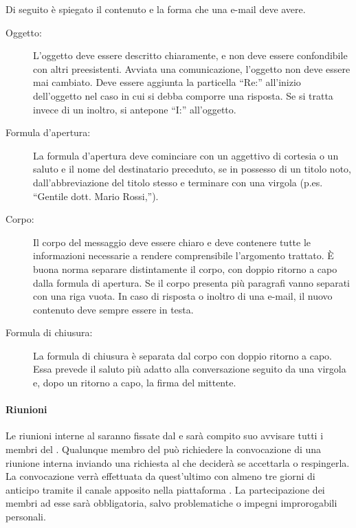 \documentclass[a4paper, titlepage]{article}
\begin{document}
Di seguito è spiegato il contenuto e la forma che una e-mail deve avere.
\begin{description}
	\item[Oggetto:] 
	L'oggetto deve essere descritto chiaramente, e non deve essere confondibile con altri preesistenti. Avviata una comunicazione, l'oggetto non deve essere mai cambiato. Deve essere aggiunta la particella ``Re:'' all'inizio dell'oggetto nel caso in cui si debba comporre una risposta. Se si tratta invece di un inoltro, si antepone ``I:'' all'oggetto.
	\item[Formula d'apertura:] 
	La formula d'apertura deve cominciare con un aggettivo di cortesia o un saluto e il nome del destinatario preceduto, se in possesso di un titolo noto, dall'abbreviazione del titolo stesso e terminare con una virgola (p.es. ``Gentile dott. Mario Rossi,'').
	\item[Corpo:] 
	Il corpo del messaggio deve essere chiaro e deve contenere tutte le informazioni necessarie a rendere comprensibile l'argomento trattato. È buona norma separare distintamente il corpo, con doppio ritorno a capo dalla formula di apertura. Se il corpo presenta più paragrafi vanno separati con una riga vuota. In caso di risposta o inoltro di una e-mail, il nuovo contenuto deve sempre essere in testa.
	\item[Formula di chiusura:] 
	La formula di chiusura è separata dal corpo con doppio ritorno a capo. Essa prevede il saluto più adatto alla conversazione seguito da una virgola e, dopo un ritorno a capo, la firma del mittente.
\end{description}


\newpage


\paragraph{Riunioni}

Le riunioni interne al  saranno fissate dal  e sarà compito suo avvisare tutti i membri del . Qualunque membro del  può richiedere la convocazione di una riunione interna inviando una richiesta al  che deciderà se accettarla o respingerla. La convocazione verrà effettuata da quest'ultimo con almeno tre giorni di anticipo tramite il canale apposito nella piattaforma . La partecipazione dei membri ad esse sarà obbligatoria, salvo problematiche o impegni improrogabili personali.
\end{document}
